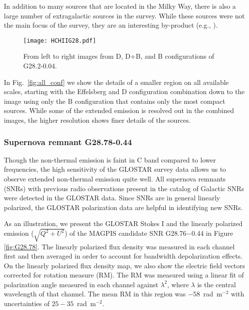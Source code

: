 \documentclass{aa}
\begin{document}
In addition to many sources that are located in the Milky Way, there is also a large number of extragalactic sources in the survey. While these sources were not the main focus of the survey, they are an interesting by-product (e.g., \citealt{Chakraborty2020}).  

\begin{figure*}
\begin{center}
    \texttt{[image: HCHIIG28.pdf]} 
\caption{From left to right images from D, D+B, and B configurations  of G28.2-0.04.}
\label{fig:HCHIIG28}
\end{center}
\end{figure*}

In Fig.~\ref{fig:all_conf} we show the details of a smaller region on all available scales, starting with the Effelsberg and D configuration combination down to the image using only the B configuration that contains only the most compact sources. While some of the extended emission is resolved out in the combined images, the higher resolution shows finer details of the sources.


\subsubsection{Supernova remnant G28.78-0.44}


Though the non-thermal emission is faint in C band compared to lower frequencies, the high sensitivity of the GLOSTAR survey data allows us to observe extended non-thermal emission quite well.  All supernova remnants (SNRs) with previous radio observations present in the catalog of Galactic SNRs \citep{Green2019} were detected in the GLOSTAR data.  Since SNRs are in general linearly polarized, the GLOSTAR polarization data are helpful in identifying new SNRs.

As an illustration, we present  the GLOSTAR Stokes I and the linearly polarized emission ($\sqrt{Q^2 + U^2}$) of the MAGPIS candidate SNR G28.76$-$0.44 \citep{HelfandBecker2006} in Figure \ref{fig:G28.78}.  The linearly polarized flux density was measured in each channel first and then averaged in order to account for bandwidth depolarization effects.  On the linearly polarized flux density map, we also show the electric field vectors corrected for rotation measure (RM).  The RM was measured using a linear fit of polarization angle measured in each channel against $\lambda^2$, where $\lambda$ is the central wavelength of that channel. The mean RM in this region was $-58$~rad~m$^{-2}$ with uncertainties of $25-35$~rad~m$^{-2}$.
\end{document}
